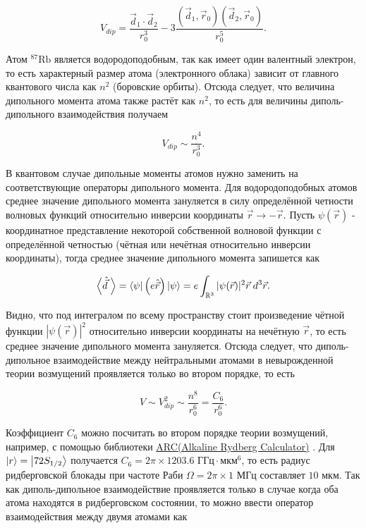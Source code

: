 \begin{equation}
	V_{dip} = \frac{\vec{d}_1 \cdot \vec{d}_2}{r_0^3} - 3\frac{\left(\vec{d}_1, \vec{r}_0\right)\left(\vec{d}_2, \vec{r}_0\right)}{r_0^5}.
\end{equation}

Атом $^{87}\text{Rb}$ является водородоподобным, так как имеет один валентный электрон, то есть характерный размер атома (электронного облака) зависит от главного квантового числа как $n^2$ (боровские орбиты). Отсюда следует, что величина дипольного момента атома также растёт как $n^2$, то есть для величины диполь-дипольного взаимодействия получаем 

\begin{equation}
	V_{dip} \sim \frac{n^4}{r_0^3}. 
\end{equation}

В квантовом случае дипольные моменты атомов нужно заменить на соответствующие операторы дипольного момента. Для водородоподобных атомов среднее значение дипольного момента зануляется в силу определённой четности волновых функций \cite{Belousov} относительно инверсии координаты $\vec{r} \rightarrow -\vec{r}$. Пусть $\psi(\vec{r})$ - координатное представление некоторой собственной волновой функции с определённой четностью (чётная или нечётная относительно инверсии координаты), тогда среднее значение дипольного момента запишется как

\begin{equation}
	\left< \hat{\vec{d}}\;\right> = \left\langle \psi \right|\left( e \hat{\vec{r}}\right)\left| \psi \right\rangle = e\int_{\mathbb{R}^3}|\psi(\vec{r})|^2\vec{r} \; d^3\vec{r}.
\end{equation}

Видно, что под интегралом по всему пространству стоит произведение чётной функции $|\psi(\vec{r})|^2$ относительно инверсии координаты на нечётную $\vec{r}$, то есть среднее значение дипольного момента зануляется. Отсюда следует, что диполь-дипольное взаимодействие между нейтральными атомами в невырожденной теории возмущений проявляется только во втором порядке, то есть 

\begin{equation}
	V \sim V_{dip}^2 \sim \frac{n^8}{r_0^6} = \frac{C_6}{r_0^6}.
\end{equation}

Коэффициент $C_6$ можно посчитать во втором порядке теории возмущений, например, с помощью библиотеки \href{https://arc-alkali-rydberg-calculator.readthedocs.io/en/latest/}{ARC(Alkaline Rydberg Calculator)} \cite{ROBERTSON2021107814}. Для $\left| r \right\rangle = \left| 72 S_{1/2} \right\rangle$ получается $C_6 = 2\pi \times 1203.6 \text{ ГГц}\cdot \text{мкм}^6$, то есть радиус ридберговской блокады при частоте Раби $\Omega = 2\pi \times 1 \text{ МГц}$ составляет $10 \text{ мкм}$. Так как диполь-дипольное взаимодействие проявляется только в случае когда оба атома находятся в ридберговском состоянии, то можно ввести оператор взаимодействия между двумя атомами как 

